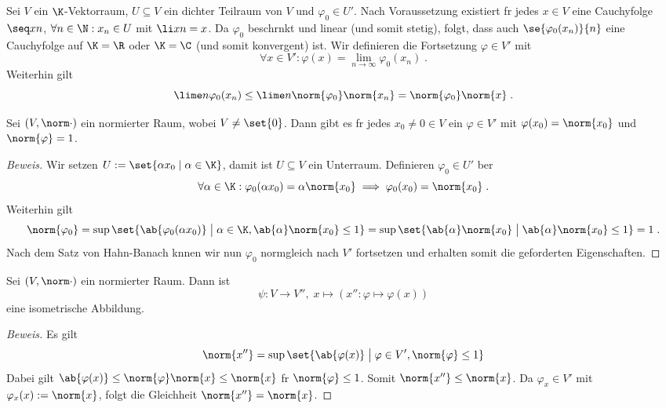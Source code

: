 	\begin{ex}
		Sei $V$ ein $\K$-Vektorraum, \(U\subseteq V\) ein dichter Teilraum von $V$ und \(\varphi_0\in U'\). Nach Voraussetzung existiert f\us r jedes \(x\in V\) eine Cauchyfolge  \(\seq xn\), \(\forall n\in \N: x_n \in U\) mit \(\li xn = x\). Da $\varphi_0$ beschr\as nkt und linear (und somit stetig), folgt, dass auch \(\se{\varphi_0(x_n)}{n}\) eine Cauchyfolge auf  \(\K = \R\) oder \(\K = \C\) (und somit konvergent) ist. Wir definieren die  Fortsetzung \(\varphi \in V'\) mit
		\[\forall x\in V' : \varphi(x) = \lim_{n\to\infty} \varphi_0(x_n)\;.\]
		Weiterhin gilt
		\[\lime n \varphi_0(x_n) \leq \lime n\norm{\varphi_0} \norm{x_n} = \norm{\varphi_0}\norm{x}\;. \]
		
	\end{ex} 
	
	\begin{theorem}
		Sei \((V,\norm\cdot)\) ein normierter Raum, wobei \(V \neq \set{0}\). Dann gibt es f\us r jedes \(x_0\neq 0 \in V\) ein \(\varphi \in V'\) mit \(\varphi(x_0) = \norm{x_0}\) und \(\norm{\varphi} = 1\).
	\end{theorem}
	\begin{proof}[Beweis]
		Wir setzen \(U:=\set{\alpha x_0\;\vert\; \alpha \in \K}\), damit ist \(U\subseteq V\) ein Unterraum. Definieren \(\varphi_0\in U'\) \us ber 
		\[\forall \alpha \in \K: \varphi_0(\alpha x_0) = \alpha \norm{x_0} \implies \varphi_0(x_0) = \norm{x_0}\;.\]
		Weiterhin gilt
		\[\norm{\varphi_0} = \sup \set{\ab{\varphi_0(\alpha x_0)} \;\big\vert\; \alpha \in \K, \ab{\alpha}\norm{x_0} \leq 1} = \sup \set{\ab{\alpha} \norm{x_0} \;\big\vert\; \ab{\alpha}\norm{x_0} \leq 1} = 1\;.\]
		Nach dem Satz von Hahn-Banach k\os nnen wir nun \(\varphi_0\) normgleich nach \(V'\) fortsetzen und erhalten somit die geforderten Eigenschaften.
	\end{proof}	
	
	\begin{theorem}
		\label{Doppeldual_1} Sei \((V,\norm\cdot)\) ein normierter Raum. Dann ist 
		\[\psi: V \to V'',\; x \mapsto (x'':\varphi \mapsto \varphi(x))\]
		eine isometrische Abbildung.
	\end{theorem}
	\begin{proof}[Beweis]
		Es gilt 
		\[\norm{x''} = \sup\set{\ab{\varphi(x)} \;\big\vert\;\varphi\in V', \norm{\varphi} \leq 1} \]
		Dabei gilt \(\ab{\varphi(x)} \leq \norm{\varphi}\norm{x} \leq \norm{x}\) f\us r \(\norm{\varphi}\leq 1\). Somit \(\norm{x''} \leq \norm{x}\). Da \(\varphi_x \in V'\) mit \(\varphi_x(x):= \norm{x}\), folgt die Gleichheit \(\norm{x''} = \norm{x}\).
			
	\end{proof}
	
